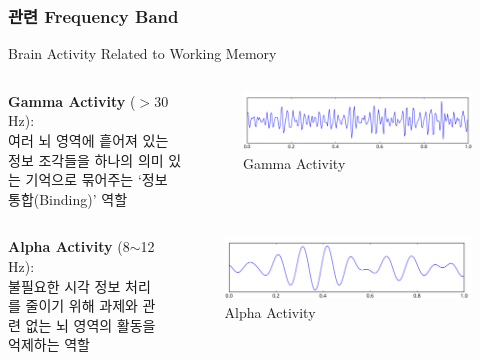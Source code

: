 \documentclass{beamer}
\begin{document}
\subsubsection{관련 Frequency Band}
\begin{frame}{Brain Activity Related to Working Memory}
  \begin{columns}
    \begin{column}{0.52\textwidth}
      \large
      \textbf{Gamma Activity} ($>$30 Hz):\\여러 뇌 영역에 흩어져 있는 정보 조각들을 하나의 의미 있는 기억으로 묶어주는 `정보 통합(Binding)' 역할
    \end{column}
    \hfill
    \begin{column}{0.48\textwidth}
      \centering
      \begin{figure}
        \centering
        \includegraphics[width=\textwidth]{image/gamma}
        \caption{Gamma Activity}
      \end{figure}
    \end{column}
  \end{columns}
  \begin{columns}
    \begin{column}{0.52\textwidth}
      \large
      \textbf{Alpha Activity} (8$\sim$12 Hz):\\불필요한 시각 정보 처리를 줄이기 위해 과제와 관련 없는 뇌 영역의 활동을 억제하는 역할
    \end{column}
    \hfill
    \begin{column}{0.48\textwidth}
      \centering
      \begin{figure}
        \centering
        \includegraphics[width=\textwidth]{image/alpha}
        \caption{Alpha Activity}
      \end{figure}
    \end{column}
  \end{columns}
\end{frame}
\end{document}
